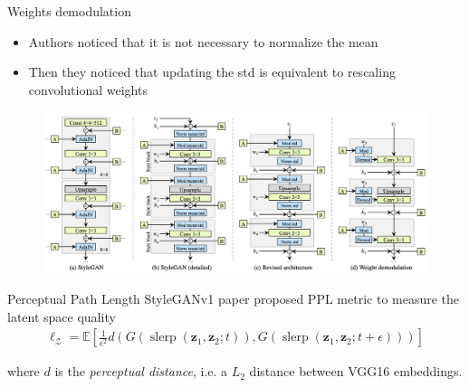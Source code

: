 \documentclass[handout, 10pt]{beamer}
\begin{document}
\begin{frame}{Weights demodulation}
\begin{itemize}
    \item\pause Authors noticed that it is not necessary to normalize the mean
    \item\pause Then they noticed that updating the std is equivalent to rescaling convolutional weights 
\end{itemize}

\begin{figure}
\centering
\includegraphics[width=\textwidth]{images/weight-demodulation}
\end{figure}
\end{frame}


\begin{frame}{Perceptual Path Length}
StyleGANv1 paper proposed PPL metric to measure the latent space quality
\begin{equation}
\begin{aligned}
\ell_{\mathcal{Z}}=\mathbb{E}\left[\frac{1}{\epsilon^{2}} d\left(G\left(\operatorname{slerp}\left(\mathbf{z}_{1}, \mathbf{z}_{2} ; t\right)\right), G\left(\operatorname{slerp}\left(\mathbf{z}_{1}, \mathbf{z}_{2} ; t+\epsilon\right)\right)\right)\right]
\end{aligned}
\end{equation}

where $d$ is the \textit{perceptual distance}, i.e. a $L_2$ distance between VGG16 embeddings.

\end{frame}


\end{document}
